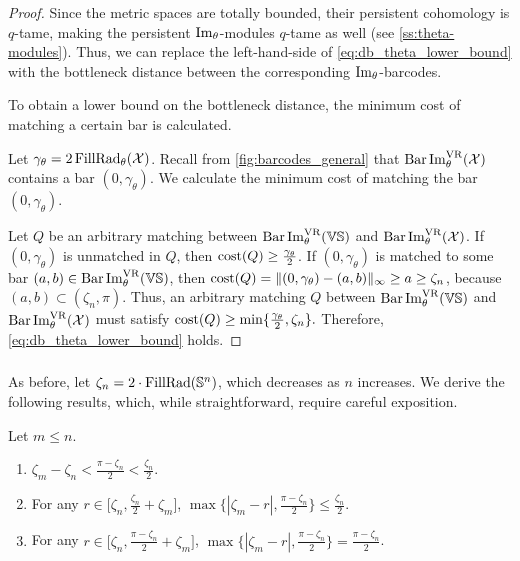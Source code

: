 \begin{proof}
    Since the metric spaces are totally bounded, their persistent cohomology is $q$-tame, making the persistent $\operatorname{Im}_\theta$-modules $q$-tame as well (see \cref{ss:theta-modules}).
    Thus, we can replace the left-hand-side of \cref{eq:db_theta_lower_bound} with the bottleneck distance between the corresponding $\operatorname{Im}_\theta$-barcodes.
    
    To obtain a lower bound on the bottleneck distance, the minimum cost of matching a certain bar is calculated.

    Let $\gamma_\theta = 2\operatorname{FillRad}_{\theta}(\mathcal{X})$.
	Recall from \cref{fig:barcodes_general} that $\operatorname{Bar}\operatorname{Im}_{\theta}^{\mathrm{VR}} (\mathcal{X})$ contains a bar $(0,\gamma_\theta)$.
	We calculate the minimum cost of matching the bar $(0,\gamma_\theta)$.

	Let $Q$ be an arbitrary matching between $\operatorname{Bar}\operatorname{Im}_{\theta}^{\mathrm{VR}} (\mathbb{V}\mathbb{S})$ and $\operatorname{Bar}\operatorname{Im}_{\theta}^{\mathrm{VR}} (\mathcal{X})$.
	If $(0,\gamma_\theta )$ is unmatched in $Q$, then $\mathrm{cost}(Q) \geq \tfrac{\gamma_\theta }{2}$.
	If $(0,\gamma_\theta )$ is matched to some bar $(a,b) \in \operatorname{Bar}\operatorname{Im}_{\theta}^{\mathrm{VR}} (\mathbb{V}\mathbb{S})$, then
	$\mathrm{cost}(Q) =  \|(0,\gamma_\theta ) - (a,b)\|_\infty \geq a \geq \zeta_n$, because $(a,b) \subset (\zeta_n, \pi)$.
	Thus, an arbitrary matching $Q$ between $\operatorname{Bar}\operatorname{Im}_{\theta}^{\mathrm{VR}} (\mathbb{V}\mathbb{S})$ and $\operatorname{Bar}\operatorname{Im}_{\theta}^{\mathrm{VR}} (\mathcal{X})$ must satisfy $\mathrm{cost}(Q) \geq \min\{\tfrac{\gamma_\theta }{2}, \zeta_n\}.$
	Therefore, \cref{eq:db_theta_lower_bound} holds.
\end{proof}


\subsubsection{}
\label{subsub:comparison_lemma}

As before, let $\zeta_n = 2 \cdot \operatorname{FillRad}(\mathbb{S}^n)$, which decreases as $n$ increases.
We derive the following results, which, while straightforward, require careful exposition.

\medskip\lemma
Let $m \leq n$.
\begin{enumerate}
    \item \(\zeta_m - \zeta_n < \tfrac{\pi - \zeta_n}{2} < \tfrac{\zeta_n}{2}.\)

    \item For any $r \in \big[\zeta_n, \tfrac{\zeta_n}{2}+\zeta_m\big]$, $\max\big\{|\zeta_m  - r |, \tfrac{\pi - \zeta_n}{2}\big\} \leq \tfrac{\zeta_n}{2}$.

    \item For any $r \in \big[\zeta_n, \tfrac{\pi - \zeta_n}{2} + \zeta_m\big]$, $\max\{|\zeta_m  - r |, \tfrac{\pi - \zeta_n}{2}\} = \tfrac{\pi - \zeta_n}{2}$.
\end{enumerate}


